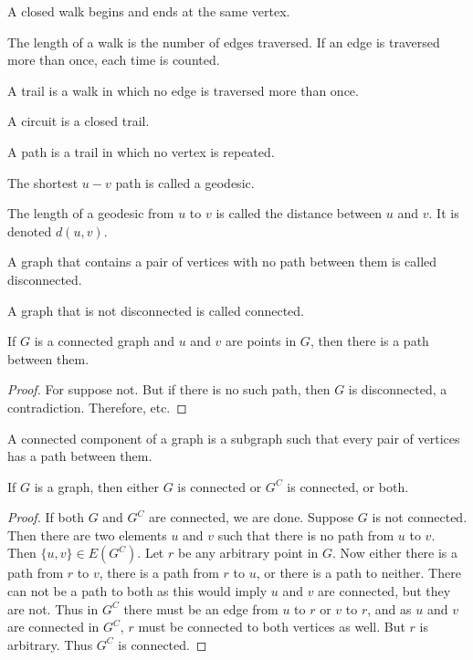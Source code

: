 \documentclass[crop=false,class=book]{standalone}
\begin{document}
\begin{definition}
A closed walk begins and ends at the same vertex.
\end{definition}
\begin{definition}
The length of a walk is the number of edges traversed. If an edge is traversed more than once, each time is counted.
\end{definition}
\begin{definition}
A trail is a walk in which no edge is traversed more than once.
\end{definition}
\begin{definition} A circuit is a closed trail.
\end{definition}
\begin{definition}
A path is a trail in which no vertex is repeated.
\end{definition}
\begin{definition}
The shortest $u-v$ path is called a geodesic.
\end{definition}
\begin{definition}
The length of a geodesic from $u$ to $v$ is called the distance between $u$ and $v$. It is denoted $d(u,v)$.
\end{definition}
\begin{definition}
A graph that contains a pair of vertices with no path between them is called disconnected.
\end{definition}
\begin{definition}
A graph that is not disconnected is called connected.
\end{definition}
\begin{corollary}
If $G$ is a connected graph and $u$ and $v$ are points in $G$, then there is a path between them.
\end{corollary}
\begin{proof}
For suppose not. But if there is no such path, then $G$ is disconnected, a contradiction. Therefore, etc.
\end{proof}
\begin{definition}
A connected component of a graph is a subgraph such that every pair of vertices has a path between them.
\end{definition}
\begin{theorem}
If $G$ is a graph, then either $G$ is connected or $G^C$ is connected, or both. 
\end{theorem}
\begin{proof}
If both $G$ and $G^C$ are connected, we are done. Suppose $G$ is not connected. Then there are two elements $u$ and $v$ such that there is no path from $u$ to $v$. Then $\{u,v\}\in E(G^C)$. Let $r$ be any arbitrary point in $G$. Now either there is a path from $r$ to $v$, there is a path from $r$ to $u$, or there is a path to neither. There can not be a path to both as this would imply $u$ and $v$ are connected, but they are not. Thus in $G^C$ there must be an edge from $u$ to $r$ or $v$ to $r$, and as $u$ and $v$ are connected in $G^C$, $r$ must be connected to both vertices as well. But $r$ is arbitrary. Thus $G^C$ is connected.
\end{proof}
\end{document}
